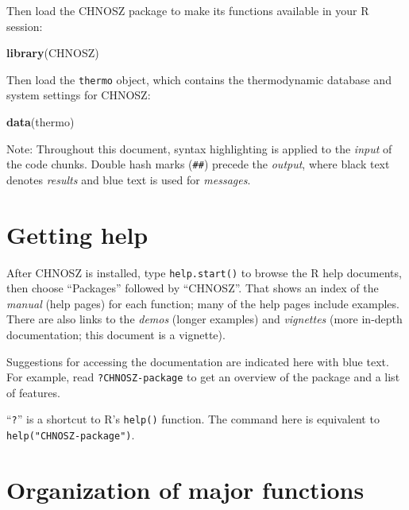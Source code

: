 \documentclass[]{tufte-book}
\newenvironment{Shaded}{}{}
\newcommand{\KeywordTok}[1]{\textcolor[rgb]{0.00,0.44,0.13}{\textbf{#1}}}
\newcommand{\NormalTok}[1]{#1}
\begin{document}
Then load the CHNOSZ package to make its functions available in your R
session:

\begin{Shaded}
\begin{Highlighting}[]
\KeywordTok{library}\NormalTok{(CHNOSZ)}
\end{Highlighting}
\end{Shaded}

Then load the \texttt{thermo} object, which contains the thermodynamic
database and system settings for CHNOSZ:

\begin{Shaded}
\begin{Highlighting}[]
\KeywordTok{data}\NormalTok{(thermo)}
\end{Highlighting}
\end{Shaded}

Note: Throughout this document, syntax highlighting is applied to the
\emph{input} of the code chunks. Double hash marks (\texttt{\#\#})
precede the \emph{output}, where black text denotes \emph{results} and
blue text is used for \emph{messages}.

\section{Getting help}\label{getting-help}

After CHNOSZ is installed, type {\texttt{help.start()}} to browse the R
help documents, then choose ``Packages'' followed by ``CHNOSZ''. That
shows an index of the \emph{manual} (help pages) for each function; many
of the help pages include examples. There are also links to the
\emph{demos} (longer examples) and \emph{vignettes} (more in-depth
documentation; this document is a vignette).

Suggestions for accessing the documentation are indicated here with
{blue text}. For example, read
{\texttt{?\textasciigrave{}CHNOSZ-package\textasciigrave{}}} to get an
overview of the package and a list of features.

\begin{marginfigure}
``\texttt{?}'' is a shortcut to R's \texttt{help()} function. The
command here is equivalent to {\texttt{help("CHNOSZ-package")}}.
\end{marginfigure}

\section{Organization of major
functions}\label{organization-of-major-functions}
\end{document}

